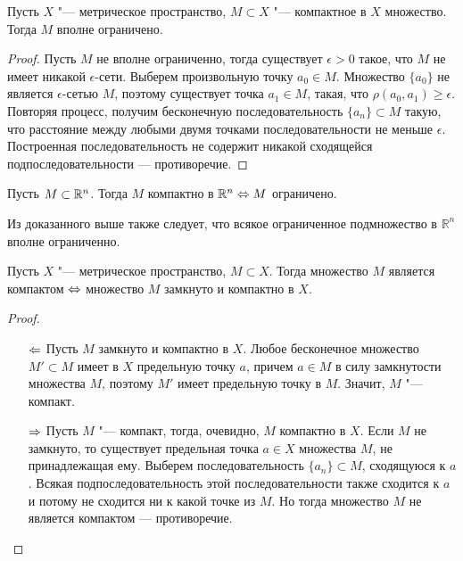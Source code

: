 \begin{theorem}
    Пусть $X$ "--- метрическое пространство, $M \subset X$ "--- компактное в $X$ множество. Тогда $M$ вполне ограничено.
\end{theorem}

\begin{proof}
    Пусть $M$ не вполне ограниченно, тогда существует $\epsilon > 0$ такое, что $M$ не имеет никакой $\epsilon$-сети. Выберем произвольную точку $a_0 \in M$. Множество $\lbrace a_0\rbrace$ не является $\epsilon$-сетью $M$, поэтому существует точка $a_1\in M$, такая, что $\rho(a_0, a_1)\geq \epsilon$. Повторяя процесс, получим бесконечную последовательность $\{a_n\} \subset M$ такую, что расстояние между любыми двумя точками последовательности не меньше $\epsilon$. Построенная последовательность не содержит никакой сходящейся подпоследовательности --- противоречие.
\end{proof}

\begin{corollary}
    Пусть $M \subset \mathbb{R}^n$. Тогда $M$ компактно в $\mathbb R^n \Leftrightarrow M$ ограничено.
\end{corollary}

\begin{note}
    Из доказанного выше также следует, что всякое ограниченное подмножество в $\mathbb R^n$ вполне ограниченно.
\end{note}

\begin{theorem}
    Пусть $X$ "--- метрическое пространство, $M \subset X$. Тогда множество $M$ является компактом $\Leftrightarrow$ множество $M$ замкнуто и компактно в $X$.
\end{theorem}

\begin{proof}~
    \begin{itemize}
        \item[$\Leftarrow$] Пусть $M$ замкнуто и компактно в $X$. Любое бесконечное множество $M' \subset M$ имеет в $X$ предельную точку $a$, причем $a\in M$ в силу замкнутости множества $M$, поэтому $M'$ имеет предельную точку в $M$. Значит, $M$ "--- компакт.
        
        \item[$\Rightarrow$] Пусть $M$ "--- компакт, тогда, очевидно, $M$ компактно в $X$. Если $M$ не замкнуто, то существует предельная точка $a \in X$ множества $M$, не принадлежащая ему. Выберем последовательность $\lbrace a_n\rbrace \subset M$, сходящуюся к $a$. Всякая подпоследовательность этой последовательности также сходится к $a$ и потому не сходится ни к какой точке из $M$. Но тогда множество $M$ не является компактом --- противоречие.\qedhere
    \end{itemize}
\end{proof}

